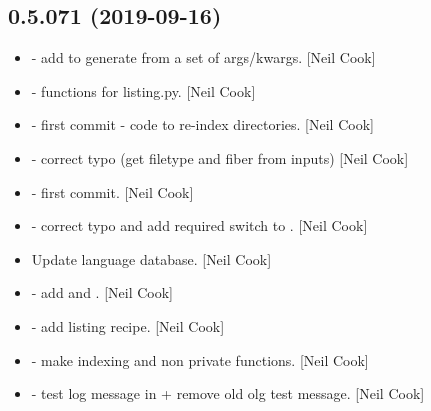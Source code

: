 \documentclass[a4paper,10pt,english]{report}
\begin{document}
\subsection{0.5.071 (2019-09-16)}
\label{\detokenize{misc/changelog:id71}}\begin{itemize}
\item {} 
 - add  to
generate  from a set of args/kwargs. {[}Neil Cook{]}

\item {} 
 - functions for listing.py. {[}Neil
Cook{]}

\item {} 
 - first commit - code to re-index directories.
{[}Neil Cook{]}

\item {} 
 - correct typo (get filetype
and fiber from inputs) {[}Neil Cook{]}

\item {} 
 - first commit. {[}Neil Cook{]}

\item {} 
 - correct typo and add required switch to
. {[}Neil Cook{]}

\item {} 
Update language database. {[}Neil Cook{]}

\item {} 
 - add  and
. {[}Neil Cook{]}

\item {} 
 - add listing recipe.
{[}Neil Cook{]}

\item {} 
 - make indexing and  non
private functions. {[}Neil Cook{]}

\item {} 
 - test log message in  + remove
old olg test message. {[}Neil Cook{]}


\end{itemize}
\end{document}
